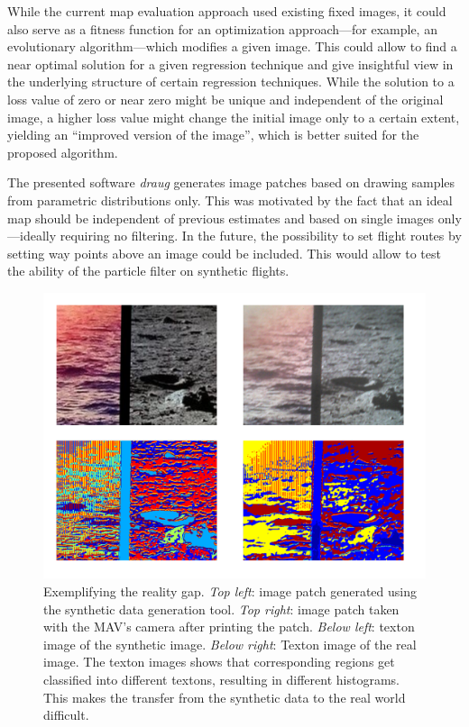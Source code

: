 \documentclass[11pt]{report}
\begin{document}
While the current map evaluation approach used existing fixed images,
it could also serve as a fitness function for an optimization
approach---for example, an evolutionary algorithm---which modifies a
given image. This could allow to find a near optimal solution for a
given regression technique and give insightful view in the underlying
structure of certain regression techniques. While the solution to a
loss value of zero or near zero might be unique and independent of the
original image, a higher loss value might change the initial image
only to a certain extent, yielding an ``improved version of the
image'', which is better suited for the proposed algorithm.

The presented software \emph{draug} generates image patches based on
drawing samples from parametric distributions only. This was motivated
by the fact that an ideal map should be independent of previous
estimates and based on single images only---ideally requiring no
filtering. In the future, the possibility to set flight routes by
setting way points above an image could be included. This would allow
to test the ability of the particle filter on synthetic flights.

\begin{figure}[h!]
\begin{center}
\includegraphics[width=0.65\columnwidth]{realitygap}
\caption{{\label{fig:realitygap} Exemplifying the reality
    gap. \emph{Top left}: image patch generated using the synthetic
    data generation tool. \emph{Top right}: image patch taken with the
    MAV's camera after printing the patch. \emph{Below left}: texton
    image of the synthetic image. \emph{Below right}: Texton image of
    the real image. The texton images shows that corresponding regions
    get classified into different textons, resulting in different
    histograms. This makes the transfer from the synthetic data to the
    real world difficult.%
  }}
\end{center}
\end{figure}
\end{document}
